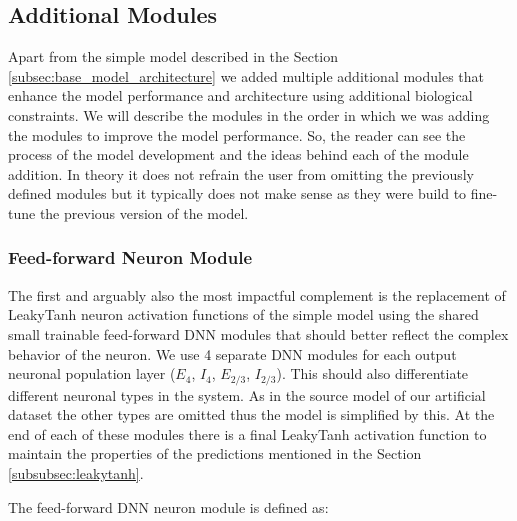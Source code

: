 \subsection{Additional Modules}
\label{subsec:additional_modules}
Apart from the simple model described in the Section \ref{subsec:base_model_architecture} we added multiple additional modules that enhance the model performance and architecture using additional biological constraints. We will describe the modules in the order in which we was adding the modules to improve the model performance. So, the reader can see the process of the model development and the ideas behind each of the module addition. In theory it does not refrain the user from omitting the previously defined modules but it typically does not make sense as they were build to fine-tune the previous version of the model.

\subsubsection{Feed-forward Neuron Module}
\label{subsubsec:dnn_neuron}
The first and arguably also the most impactful complement is the replacement of LeakyTanh neuron activation functions of the simple model using the shared small trainable feed-forward DNN modules that should better reflect the complex behavior of the neuron. We use 4 separate DNN modules for each output neuronal population layer ($E_4$, $I_4$, $E_{2/3}$, $I_{2/3}$). This should also differentiate different neuronal types in the system. As in the source model of our artificial dataset the other types are omitted thus the model is simplified by this. At the end of each of these modules there is a final LeakyTanh activation function to maintain the properties of the predictions mentioned in the Section \ref{subsubsec:leakytanh}.

The feed-forward DNN neuron module is defined as:

